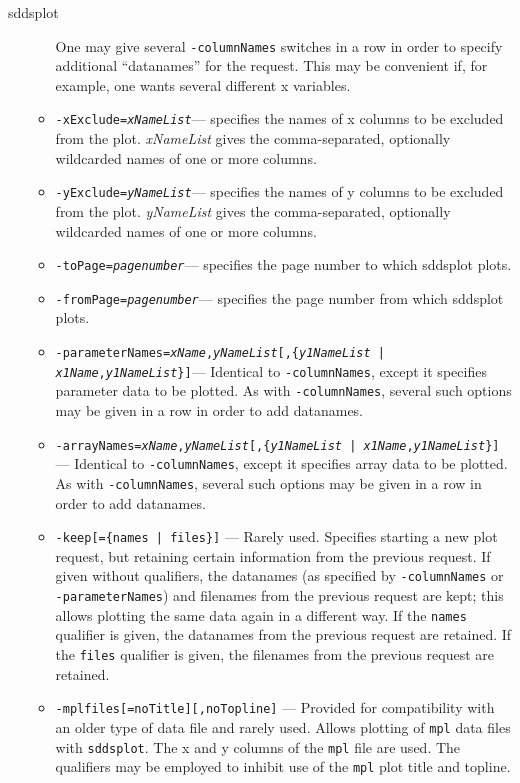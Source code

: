 \begin{sddsprog}{sddsplot}
\begin{itemize}
\begin{itemize}
        One may give several {\tt -columnNames} switches in a row in order to specify additional ``datanames'' for
        the request.  This may be convenient if, for example, one wants several different x variables.
  \item {\tt -xExclude={\em xNameList}}---
        specifies the names of x columns to be excluded from the plot. 
        {\em xNameList} gives the comma-separated, optionally wildcarded names of one or more columns.
  \item {\tt -yExclude={\em yNameList}}---
        specifies the names of y columns to be excluded from the plot. 
        {\em yNameList} gives the comma-separated, optionally wildcarded names of one or more columns.
  \item {\tt -toPage={\em pagenumber}}---
        specifies the page number to which sddsplot plots.
  \item {\tt -fromPage={\em pagenumber}}---
        specifies the page number from which sddsplot plots.      
  \item {\tt -parameterNames={\em xName},{\em yNameList}[,\{{\em y1NameList} | {\em x1Name},{\em y1NameList}\}]}---
        Identical to {\tt -columnNames}, except it specifies parameter data to be plotted.  As with {\tt -columnNames},
        several such options may be given in a row in order to add datanames.
  \item {\tt -arrayNames={\em xName},{\em yNameList}[,\{{\em y1NameList} | {\em x1Name},{\em y1NameList}\}]}---
        Identical to {\tt -columnNames}, except it specifies array data to be plotted.  As with {\tt -columnNames},
        several such options may be given in a row in order to add datanames.

  \item {\tt -keep[=\{names | files\}]} ---
        Rarely used.
        Specifies starting a new plot request, but retaining certain information from the previous request.
        If given without qualifiers, the datanames (as specified by {\tt -columnNames} or {\tt -parameterNames})
        and filenames from the previous request are kept; this allows plotting the same data again in a different
        way.  If the {\tt names} qualifier is given, the datanames from the previous request are retained.
        If the {\tt files} qualifier is given, the filenames from the previous request are retained.

  \item {\tt -mplfiles[=noTitle][,noTopline]} ---
        Provided for compatibility with an older type of data file and rarely used.
        Allows plotting of {\tt mpl} data files with \verb|sddsplot|.  The x and y columns of the {\tt mpl} file
        are used.  The qualifiers may be employed to inhibit use of the {\tt mpl} plot title and topline.


\end{itemize}
\end{itemize}
\end{sddsprog}
